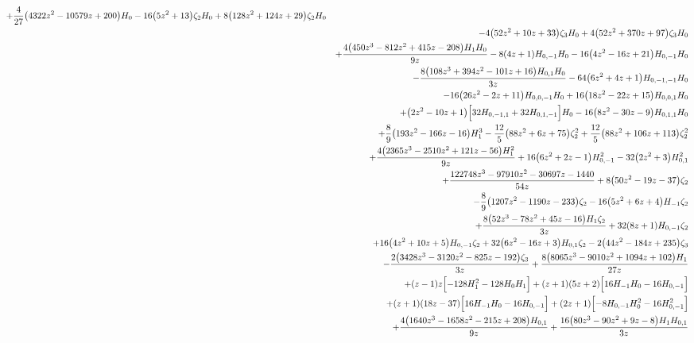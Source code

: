 \begin{eqnarray}
+\frac{4}{27} \big(4322 z^2-10579 z+200\big) H_0
-16  \big(5 z^2+13\big) \zeta_2 H_0+8 \big(128 z^2+124 z+29\big)\zeta_2 H_0
\nonumber \\ &&
-4  \big(52 z^2+10 z+33\big) \zeta_3 H_0+4 \big(52 z^2+370 z+97\big)\zeta_3 H_0
\nonumber \\ &&
+\frac{4 \big(450 z^3-812 z^2+415 z-208\big) H_1 H_0}{9 z}-8(4 z+1) H_{0,-1} H_0-16  
\big(4 z^2-16 z+21\big) H_{0,-1} H_0
\nonumber \\ &&
-\frac{8  \big(108 z^3+394 z^2-101 z+16\big) H_{0,1} H_0}{3 z}-64  \big(6 z^2+4z+1\big) H_{0,-1,-1} H_0
\nonumber \\ &&
-16  \big(26 z^2-2 z+11\big) H_{0,0,-1} H_0+16\big(18 z^2-22 z+15\big) H_{0,0,1} H_0
\nonumber \\ &&
+\big(2 z^2-10 z+1\big) \Bigl[32H_{0,-1,1}+32 H_{0,1,-1}\Bigr] H_0-16 \big(8 z^2-30 z-9\big) H_{0,1,1}H_0
\nonumber \\ &&
+\frac{8}{9} \big(193 z^2-166 z-16\big) H_1^3
-\frac{12}{5}  \big(88z^2+6 z+75\big) \zeta_2^2+\frac{12}{5} \big(88 z^2+106 z+113\big)\zeta_2^2
\nonumber \\ &&
+\frac{4 \big(2365 z^3-2510 z^2+121 z-56\big) H_1^2}{9 z}+16 \big(6 z^2+2 z-1\big) H_{0,-1}^2-32 \big(2 z^2+3\big)H_{0,1}^2
\nonumber \\ &&
+\frac{122748 z^3-97910 z^2-30697 z-1440}{54 z}+8  \big(50z^2-19 z-37\big) \zeta_2
\nonumber \\ &&
-\frac{8}{9} \big(1207 z^2-1190 z-233\big)\zeta_2-16  \big(5 z^2+6 z+4\big) H_{-1} \zeta_2
\nonumber \\ &&
+\frac{8  \big(52 z^3-78 z^2+45 z-16\big) H_1 \zeta_2}{3 z}+32  (8 z+1)H_{0,-1} \zeta_2
\nonumber \\ &&
+16 \big(4 z^2+10 z+5\big) H_{0,-1} \zeta_2+32\big(6 z^2-16 z+3\big) H_{0,1} \zeta_2-2  \big(44 z^2-184z+235\big) \zeta_3
\nonumber \\ &&
-\frac{2 \big(3428 z^3-3120 z^2-825 z-192\big)  \zeta_3}{3 z}+\frac{8 \big(8065 z^3-9010 z^2+1094 z+102\big) H_1}{27  z}
\nonumber \\ &&
+(z-1) z \Bigl[-128  H_1^2-128  H_0 H_1\Bigr]+(z+1) (5 z+2)\Bigl[16 H_{-1} H_0-16 H_{0,-1}\Bigr]
\nonumber \\ &&
+(z+1) (18 z-37) \Bigl[16  H_{-1}H_0-16  H_{0,-1}\Bigr]+(2 z+1) \Bigl[-8 H_{0,-1} H_0^2-16H_{0,-1}^2\Bigr]
\nonumber \\ &&
+\frac{4 \big(1640 z^3-1658 z^2-215 z+208\big) H_{0,1}}{9  z}+\frac{16 \big(80 z^3-90 z^2+9 z-8\big) H_1 H_{0,1}}{3 z}
\nonumber \\ &&

\end{eqnarray}
